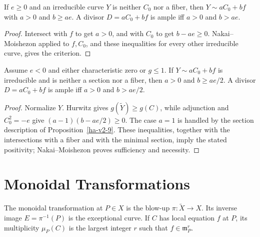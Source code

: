 \begin{proposition}
\label{ha-v2-20}
If \(e\ge0\) and an irreducible curve \(Y\) is neither \(C_0\) nor a fiber,
then \(Y\sim aC_0+bf\) with \(a>0\) and \(b\ge ae\).  A divisor
\(D=aC_0+bf\) is ample iff \(a>0\) and \(b>ae\).

\end{proposition}
\begin{proof}
Intersect with \(f\) to get \(a>0\), and with \(C_0\) to get
\(b-ae\ge0\).  Nakai--Moishezon applied to \(f,C_0\), and these inequalities
for every other irreducible curve, gives the criterion.
\end{proof}

\begin{proposition}
\label{ha-v2-21}
Assume \(e<0\) and either characteristic zero or \(g\le1\).  If
\(Y\sim aC_0+bf\) is irreducible and is neither a section nor a fiber, then
\(a>0\) and \(b\ge ae/2\).  A divisor \(D=aC_0+bf\) is ample iff
\(a>0\) and \(b>ae/2\).
\end{proposition}
\begin{proof}
Normalize \(Y\).  Hurwitz gives \(g(\widetilde Y)\ge g(C)\), while adjunction and
\(C_0^2=-e\) give
\((a-1)(b-ae/2)\ge0\).  The case \(a=1\) is handled by the section
description of Proposition~\ref{ha-v2-9}.  These inequalities, together with
the intersections with a fiber and with the minimal section, imply the stated
positivity; Nakai--Moishezon proves sufficiency and necessity.
\end{proof}

\section{Monoidal Transformations}
\label{ha-v3}

\begin{construction}
The monoidal transformation at $P\in X$ is the blow-up
$\pi:\widetilde X\to X$.  Its inverse image $E=\pi^{-1}(P)$ is the
exceptional curve.  If $C$ has local equation $f$ at $P$, its multiplicity
$\mu_P(C)$ is the largest integer $r$ such that
$f\in\mathfrak m_P^r$.
\end{construction}

